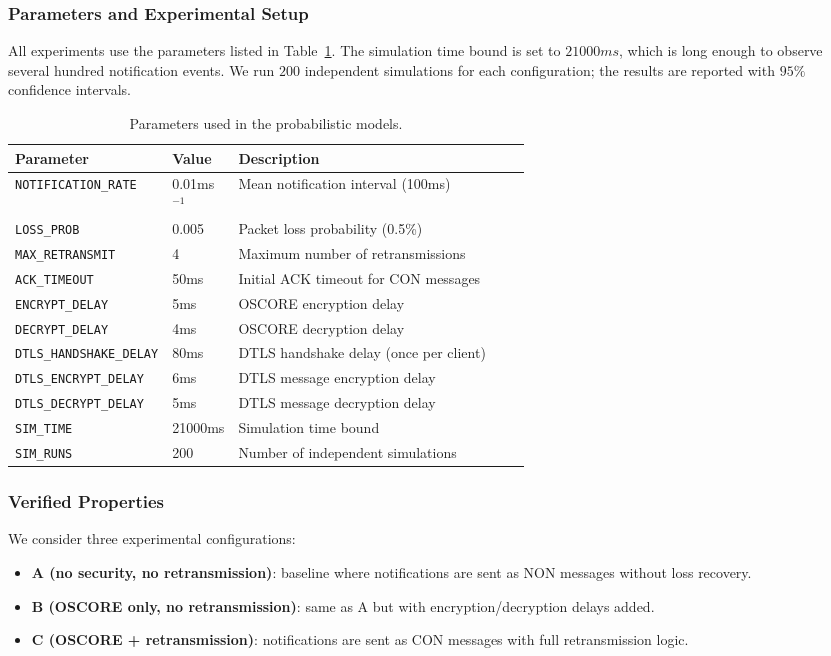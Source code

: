 \documentclass[a4paper,fleqn]{cas-sc}
\begin{document}
\subsubsection{Parameters and Experimental Setup}
All experiments use the parameters listed in Table~\ref{tab:perf-params}. The simulation time bound is set to $21000 ms$, which is long enough to observe several hundred notification events. We run $200$ independent simulations for each configuration; the results are reported with $95\%$ confidence intervals.
\begin{table}[htbp]
\centering
\caption{Parameters used in the probabilistic models.}
\label{tab:perf-params}
\begin{tabular}{llp{0.6\linewidth}}
\toprule
\textbf{Parameter} & \textbf{Value} & \textbf{Description} \\
\midrule
\texttt{NOTIFICATION\_RATE} & 0.01ms$^{-1}$ & Mean notification interval (100ms) \\
\texttt{LOSS\_PROB} & 0.005 & Packet loss probability (0.5\%) \\
\texttt{MAX\_RETRANSMIT} & 4 & Maximum number of retransmissions \\
\texttt{ACK\_TIMEOUT} & 50ms & Initial ACK timeout for CON messages \\
\texttt{ENCRYPT\_DELAY} & 5ms & OSCORE encryption delay \\
\texttt{DECRYPT\_DELAY} & 4ms & OSCORE decryption delay \\
\texttt{DTLS\_HANDSHAKE\_DELAY} & 80ms & DTLS handshake delay (once per client) \\
\texttt{DTLS\_ENCRYPT\_DELAY} & 6ms & DTLS message encryption delay \\
\texttt{DTLS\_DECRYPT\_DELAY} & 5ms & DTLS message decryption delay \\
\texttt{SIM\_TIME} & 21000ms & Simulation time bound \\
\texttt{SIM\_RUNS} & 200 & Number of independent simulations \\
\bottomrule
\end{tabular}
\end{table}

\subsubsection{Verified Properties}
We consider three experimental configurations:
\begin{itemize}
    \item \textbf{A (no security, no retransmission)}: baseline where notifications are sent as NON messages without loss recovery.
    \item \textbf{B (OSCORE only, no retransmission)}: same as A but with encryption/decryption delays added.
    \item \textbf{C (OSCORE + retransmission)}: notifications are sent as CON messages with full retransmission logic.
\end{itemize}
\end{document}

